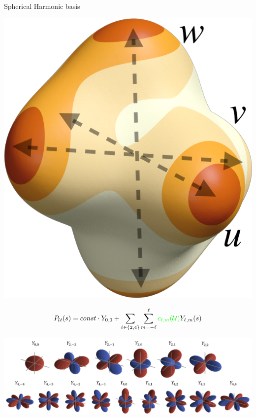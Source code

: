 \begin{frame}{Spherical Harmonic basis}
\begin{overprint}
    
    \begin{minipage}[c]{0.19\textwidth}
        \centering
          \vspace*{.5\baselineskip}
          \hfill
        \includegraphics[width=0.8\linewidth]{img_spm_ff/sperical_3dir4_rot.png}
    \end{minipage}
    \begin{minipage}[c]{0.79\textwidth}
        $$P_\mathcal{U}(s) = const \cdot Y_{0, 0} + \sum_{\ell \in \{2, 4\}} \sum_{m = -\ell}^\ell{{\color{green}c_{\ell, m}(\mathcal{U})}Y_{\ell,m}(s)}$$ 
    \end{minipage}
    
    \vspace*{.5\baselineskip}
    \includegraphics[width=\linewidth]{img_spm_ff/all_sph_harm.PNG} 
    \end{overprint}
\end{frame} 

